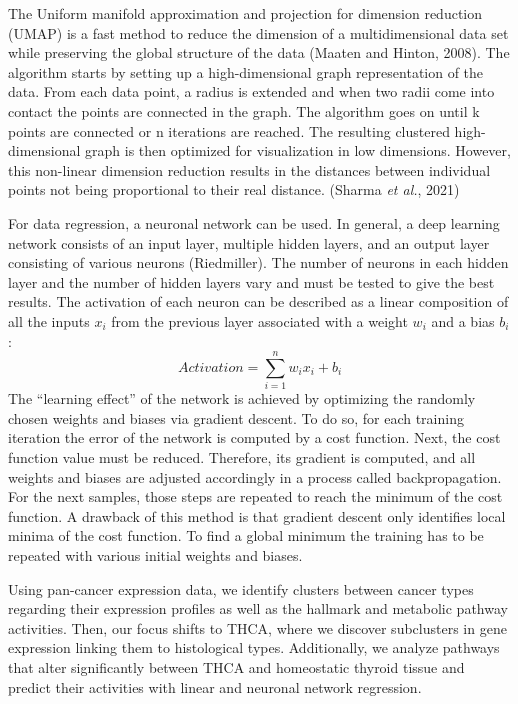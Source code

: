 \documentclass[
  11pt,
  parskip,
  oneside]{scrreprt}
\begin{document}
The Uniform manifold approximation and projection for dimension
reduction (UMAP) is a fast method to reduce the dimension of a
multidimensional data set while preserving the global structure of the
data (Maaten and Hinton, 2008). The algorithm starts by setting up a
high-dimensional graph representation of the data. From each data point,
a radius is extended and when two radii come into contact the points are
connected in the graph. The algorithm goes on until k points are
connected or n iterations are reached. The resulting clustered
high-dimensional graph is then optimized for visualization in low
dimensions. However, this non-linear dimension reduction results in the
distances between individual points not being proportional to their real
distance. (Sharma \emph{et al.}, 2021)

For data regression, a neuronal network can be used. In general, a deep
learning network consists of an input layer, multiple hidden layers, and
an output layer consisting of various neurons (Riedmiller). The number
of neurons in each hidden layer and the number of hidden layers vary and
must be tested to give the best results. The activation of each neuron
can be described as a linear composition of all the inputs \(x_i\) from
the previous layer associated with a weight \(w_i\) and a bias
\(b_i\):\[
Activation = \sum_{i=1} ^{n} w_i x_i + b_i
\]The ``learning effect'' of the network is achieved by optimizing the
randomly chosen weights and biases via gradient descent. To do so, for
each training iteration the error of the network is computed by a cost
function. Next, the cost function value must be reduced. Therefore, its
gradient is computed, and all weights and biases are adjusted
accordingly in a process called backpropagation. For the next samples,
those steps are repeated to reach the minimum of the cost function. A
drawback of this method is that gradient descent only identifies local
minima of the cost function. To find a global minimum the training has
to be repeated with various initial weights and biases.

Using pan-cancer expression data, we identify clusters between cancer
types regarding their expression profiles as well as the hallmark and
metabolic pathway activities. Then, our focus shifts to THCA, where we
discover subclusters in gene expression linking them to histological
types. Additionally, we analyze pathways that alter significantly
between THCA and homeostatic thyroid tissue and predict their activities
with linear and neuronal network regression.
\end{document}
